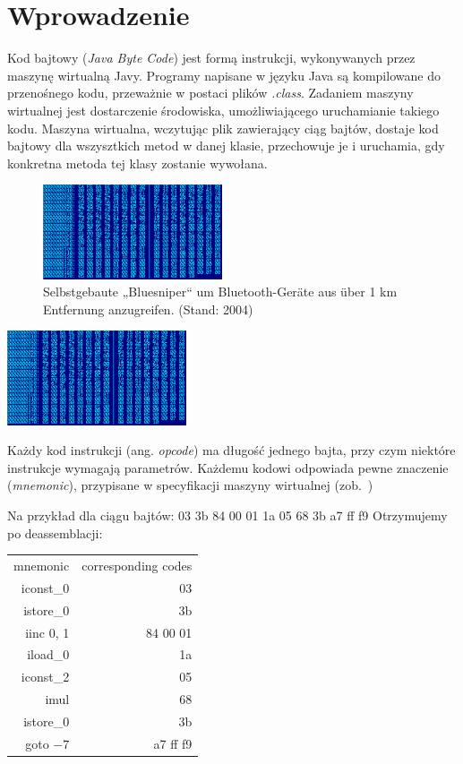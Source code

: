 \documentclass{pracamgr}
\begin{document}
    \section{Wprowadzenie}
    Kod bajtowy (\textit{Java Byte Code}) jest formą instrukcji, wykonywanych przez maszynę wirtualną Javy. Programy napisane w języku Java
    są kompilowane do przenośnego kodu, przeważnie w postaci plików \textit{.class}. Zadaniem maszyny wirtualnej
    jest dostarczenie środowiska, umożliwiającego uruchamianie takiego kodu. Maszyna wirtualna, wczytując plik zawierający ciąg bajtów, dostaje kod bajtowy dla wszysztkich metod
    w danej klasie, przechowuje je i uruchamia, gdy konkretna metoda tej klasy zostanie wywołana.
    \begin{figure} %
        \centering
        \includegraphics[width=200px]{images/class-hex.png} 
        \caption{Selbstgebaute „Bluesniper“ um Bluetooth-Geräte aus über 1 km Entfernung anzugreifen. (Stand: 2004)}
        \label{bluesniper}
    \end{figure}
    \begin{center}
        \includegraphics[width=200px]{images/class-hex.png}    
    \end{center}
    Każdy kod instrukcji (ang. \textit{opcode}) ma długość jednego bajta, przy czym niektóre instrukcje wymagają parametrów.
    Każdemu kodowi odpowiada pewne znaczenie (\textit{mnemonic}), przypisane w specyfikacji
    maszyny wirtualnej (zob.~\cite{vmspec})

    Na przykład dla ciągu bajtów: 03 3b 84 00 01 1a 05 68 3b a7 ff f9
    Otrzymujemy po deassemblacji:
    \begin{center}
        \begin{tabular}{rr}
            mnemonic & corresponding codes \\
            iconst\_0 & 03 \\
            istore\_0 & 3b \\
            iinc 0, 1 & 84 00 01 \\
            iload\_0 & 1a \\
            iconst\_2 & 05 \\
            imul & 68 \\
            istore\_0 & 3b \\
            goto $-7$ & a7 ff f9 \\
        \end{tabular}
    \end{center}
\end{document}
